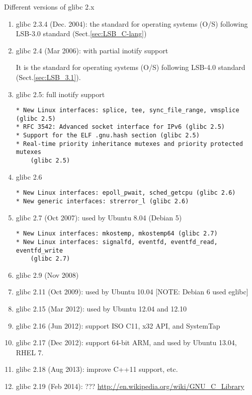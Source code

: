 Different versions of glibc 2.x
\begin{enumerate}

  \item glibc 2.3.4 (Dec. 2004): the standard for operating systems (O/S)
  following LSB-3.0 standard (Sect.\ref{sec:LSB_C-lang})
  
  \item glibc 2.4 (Mar 2006): with partial inotify support
  
  It is the standard for operating systems (O/S)
  following LSB-4.0 standard (Sect.\ref{sec:LSB_3.1}).
   

  \item glibc 2.5: full inotify support
  
\begin{verbatim}
* New Linux interfaces: splice, tee, sync_file_range, vmsplice (glibc 2.5)
* RFC 3542: Advanced socket interface for IPv6 (glibc 2.5)
* Support for the ELF .gnu.hash section (glibc 2.5)
* Real-time priority inheritance mutexes and priority protected mutexes
	(glibc 2.5)
\end{verbatim}
  
  \item glibc 2.6

\begin{verbatim}
* New Linux interfaces: epoll_pwait, sched_getcpu (glibc 2.6)
* New generic interfaces: strerror_l (glibc 2.6) 
\end{verbatim}

  \item glibc 2.7 (Oct 2007): used by Ubuntu 8.04 (Debian 5)

\begin{verbatim}
* New Linux interfaces: mkostemp, mkostemp64 (glibc 2.7)
* New Linux interfaces: signalfd, eventfd, eventfd_read, eventfd_write
	(glibc 2.7)
\end{verbatim}


  \item glibc 2.9 (Nov 2008)
    
  \item glibc 2.11 (Oct 2009): used by Ubuntu 10.04 [NOTE: Debian 6 used eglibc]
  
  \item glibc 2.15 (Mar 2012): used by Ubuntu 12.04 and 12.10 
  
  \item glibc 2.16 (Jun 2012): support ISO C11, x32 API, and SystemTap
  
  \item glibc 2.17 (Dec 2012): support 64-bit ARM, and used by Ubuntu
  13.04, RHEL 7.
  
  \item glibc 2.18 (Aug 2013): improve C++11 support, etc.
  
  \item glibc 2.19 (Feb 2014): ???
  \url{http://en.wikipedia.org/wiki/GNU_C_Library}
\end{enumerate}

